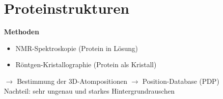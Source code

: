 \section{Proteinstrukturen}
\textbf{Methoden}
\begin{itemize}
\item NMR-Spektroskopie (Protein in Lösung)
\item Röntgen-Kristallographie (Protein als Kristall)
\end{itemize}
$\rightarrow$ Bestimmung der 3D-Atompositionen $\rightarrow$ Position-Database (PDP)\\

Nachteil: sehr ungenau und starkes Hintergrundrauschen